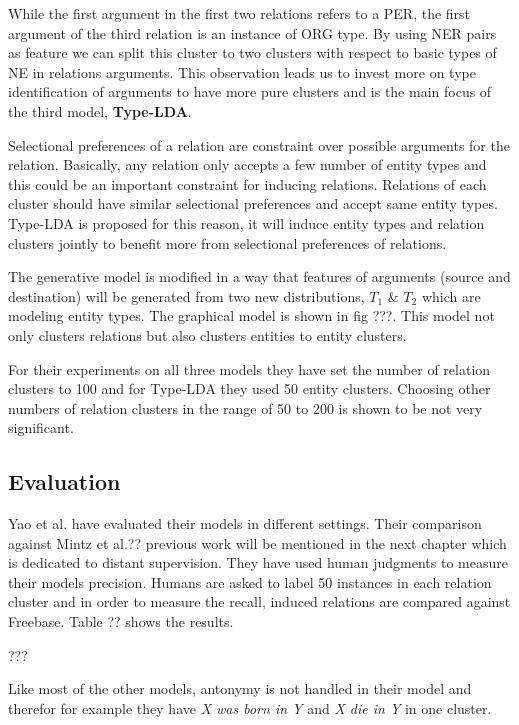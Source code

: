 \documentclass[12pt]{report}
\begin{document}
 While the first argument in the first two relations refers to a PER, the first argument of the 
 third relation is an instance of ORG type. By using NER pairs as feature we can split this cluster 
 to two clusters with respect to basic types of NE in relations arguments. 
 This observation leads us to invest more on type identification of arguments to have more pure 
 clusters and is the main focus of the third model, \textbf{Type-LDA}.
 
 
 Selectional preferences of a relation are constraint over possible arguments for the relation.
  Basically, any relation only accepts a few number of entity types and this could be an important constraint
   for inducing relations. Relations of each cluster should have similar selectional preferences and
    accept same entity types. Type-LDA is proposed for this reason, it will induce entity types 
    and relation clusters jointly to benefit more from selectional preferences of relations.
    
    The generative model is modified in a way that features of arguments (source and destination)
    will be generated from two new distributions, $T_1$ \& $T_2$ which are modeling entity types. The graphical model
    is shown in fig ???. This model not only clusters relations but also clusters entities to entity clusters.
    
    For their experiments on all three models they have set the number of relation clusters to 100 and for Type-LDA they used 
     50 entity clusters. Choosing other numbers of relation clusters in the range of 50 to 200 is shown to be not very significant.
    
\subsection {Evaluation}
\label{ch:evaluation}

Yao et al. have evaluated their models in different settings. Their comparison against Mintz et al.?? previous work
 will be mentioned in the next chapter which is dedicated to distant supervision. They have used human judgments 
 to measure their models precision. Humans are asked to label 50 instances in each relation cluster and in order to measure
 the recall, induced relations are compared against Freebase. Table ?? shows the results.
 
 ???
 
 Like most of the other models, antonymy is not handled in their model and therefor for example they have
 \emph{X was born in Y} and \emph{X die in Y} in one cluster.
 
\end{document}
